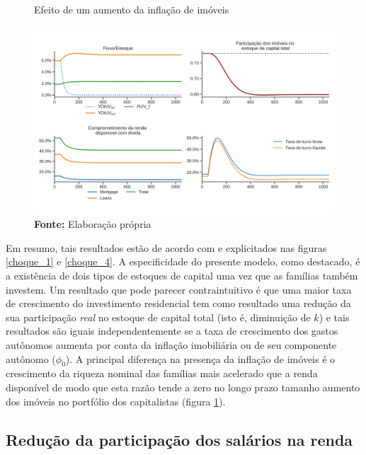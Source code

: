 \begin{figure}[H]
	\centering
	\caption{Efeito de um aumento da inflação de imóveis}
	\label{choque_4Norms}
	\includegraphics[width=\textwidth]{../../Modelo/Versoes/Shock_4Norms.png}
	\caption*{\textbf{Fonte:} Elaboração própria}
\end{figure}


Em resumo, tais resultados estão de acordo com \textcite{freitas_growth_2015} e explicitados nas figuras \ref{choque_1} e \ref{choque_4}. A especificidade do presente modelo, como destacado, é a existência de dois tipos de estoques de capital uma vez que as famílias também investem. Um resultado que pode parecer contraintuitivo é que uma maior taxa de crescimento do investimento residencial tem como resultado uma redução  da sua participação \textit{real} no estoque de capital total (isto é, diminuição de $k$) e tais resultados são iguais independentemente se a taxa de crescimento dos gastos autônomos aumenta por conta da inflação imobiliária ou de seu componente autônomo ($\phi_0$). 
A principal diferença na presença da inflação de imóveis é o crescimento da riqueza nominal das famílias mais acelerado que a renda disponível de modo que esta razão tende a zero no longo prazo tamanho aumento dos imóveis no portfólio dos capitalistas (figura \ref{choque_4Norms}).

\subsection*{Redução da participação dos salários na renda}


